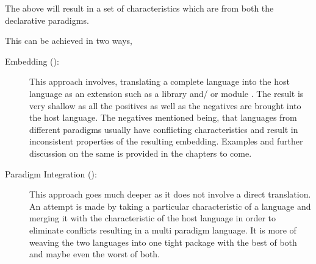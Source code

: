 \documentclass[proposal.tex]{subfiles}
\begin{document}
The above will result in a set of characteristics which are from both the declarative paradigms. 
   
This can be achieved in two ways,
\begin{description}
\item [Embedding ():]

\par This approach involves, translating a complete language into the host language as an extension such as a library and/ or module . The result is very 
shallow as all the positives as well as the negatives are brought into the host language. The negatives mentioned being, that languages from different 
paradigms usually have conflicting characteristics and result in inconsistent properties of the resulting embedding. Examples and further discussion on 
the same is provided in the chapters to come.  

\item [Paradigm Integration ():]

\par This approach goes much deeper as it does not involve a direct translation. An attempt is made by taking a particular characteristic of a language 
and merging it with the characteristic of the host language in order to eliminate conflicts resulting in a multi paradigm language. It is more of weaving 
the two languages into one tight package with the best of both and maybe even the worst of both.       
\end{description}


%



\end{document}
